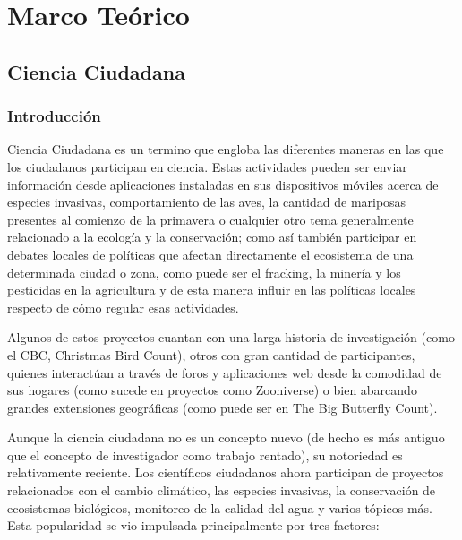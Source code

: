 \chapter{Marco Teórico}
\section{Ciencia Ciudadana}
		
	
\subsection{Introducción}
    
    Ciencia Ciudadana es un termino que engloba las diferentes maneras en las que los ciudadanos participan en ciencia. Estas actividades pueden ser enviar información desde aplicaciones instaladas en sus dispositivos móviles acerca de especies invasivas, comportamiento de las aves, la cantidad de mariposas presentes al comienzo de la primavera o cualquier otro tema generalmente relacionado a la ecología y la conservación; como así también participar en debates locales de políticas que afectan directamente el ecosistema de una determinada ciudad o zona, como puede ser el fracking, la minería y los pesticidas en la agricultura y de esta manera influir en las políticas locales respecto de cómo regular esas actividades.\cite{envCitizenScience}
    
	Algunos de estos proyectos cuantan con una larga historia de investigación (como el CBC, Christmas Bird Count), otros con gran cantidad de participantes, quienes interactúan a través de foros y aplicaciones web desde la comodidad de sus hogares (como sucede en proyectos como Zooniverse) o bien abarcando grandes extensiones geográficas (como puede ser en The Big Butterfly Count). \cite{shirk2012public} 
		
	Aunque la ciencia ciudadana no es un concepto nuevo (de hecho es más antiguo que el concepto de investigador como trabajo rentado), su notoriedad es relativamente reciente. Los científicos ciudadanos ahora participan de proyectos relacionados con el cambio climático, las especies invasivas, la conservación de ecosistemas biológicos, monitoreo de la calidad del agua y varios tópicos más. Esta popularidad se vio impulsada principalmente por tres factores:


